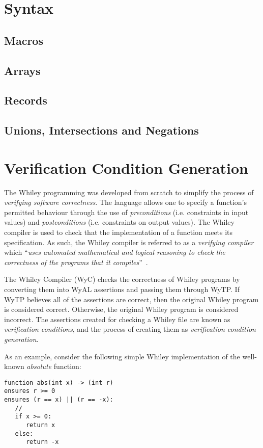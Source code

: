 \section{Syntax}
\subsection{Macros}
\subsection{Arrays}
\subsection{Records}
\subsection{Unions, Intersections and Negations}

\section{Verification Condition Generation}

The Whiley programming was developed from scratch to simplify the
process of {\em verifying software correctness}.  The language allows
one to specify a function's permitted behaviour through the use of
{\em preconditions} (i.e. constraints in input values) and {\em
  postconditions} (i.e. constraints on output values).  The Whiley
compiler is used to check that the implementation of a function meets
its specification.  As such, the Whiley compiler is referred to as a
{\em verifying compiler} which ``{\em uses automated mathematical and
  logical reasoning to check the correctness of the programs that it
  compiles}''~\cite{Hoare03}.

The Whiley Compiler (WyC) checks the correctness of Whiley programs by
converting them into WyAL assertions and passing them through WyTP.
If WyTP believes all of the assertions are correct, then the original
Whiley program is considered correct.  Otherwise, the original Whiley
program is considered incorrect.  The assertions created for checking
a Whiley file are known as {\em verification conditions}, and the
process of creating them as {\em verification condition generation}.

As an example, consider the following simple Whiley implementation of
the well-known {\em absolute} function:

\begin{lstlisting}[language=Whiley]
function abs(int x) -> (int r)
ensures r >= 0
ensures (r == x) || (r == -x):
   //
   if x >= 0:
      return x
   else:
      return -x
\end{lstlisting}


